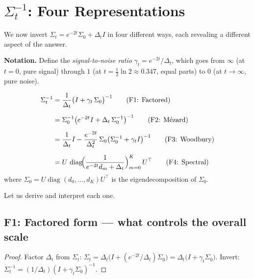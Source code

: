 \documentclass[11pt,a4paper]{article}
\theoremstyle{definition}
\newcommand{\diag}{\operatorname{diag}}
\newcommand{\Dt}{\Delta_t}
\begin{document}
\section{$\Sigma_t^{-1}$: Four Representations}
\label{sec:inversion}

We now invert $\Sigma_t = e^{-2t}\Sigma_0 + \Dt I$ in four different ways, each revealing a different aspect of the answer.

\medskip
\textbf{Notation.}
Define the \emph{signal-to-noise ratio} $\gamma_t = e^{-2t}/\Dt$, which goes from $\infty$ (at $t=0$, pure signal) through $1$ (at $t = \frac{1}{2}\ln 2 \approx 0.347$, equal parts) to $0$ (at $t \to \infty$, pure noise).

\begin{keybox}
\begin{align}
  \Sigma_t^{-1} &= \frac{1}{\Dt}\bigl(I + \gamma_t\,\Sigma_0\bigr)^{-1} \label{eq:factored} \tag{F1: Factored}\\[6pt]
  &= \Sigma_0^{-1}\bigl(e^{-2t}I + \Dt\,\Sigma_0^{-1}\bigr)^{-1} \label{eq:mezard} \tag{F2: M\'ezard}\\[6pt]
  &= \frac{1}{\Dt}I - \frac{e^{-2t}}{\Dt^2}\,\Sigma_0\bigl(\Sigma_0^{-1} + \gamma_t I\bigr)^{-1} \label{eq:woodbury} \tag{F3: Woodbury}\\[6pt]
  &= U\,\diag\!\Bigl(\frac{1}{e^{-2t}d_m + \Dt}\Bigr)_{m=0}^K\,U^\top \label{eq:spectral} \tag{F4: Spectral}
\end{align}
where $\Sigma_0 = U\diag(d_0,\dots,d_K)U^\top$ is the eigendecomposition of $\Sigma_0$.
\end{keybox}

Let us derive and interpret each one.

\subsection{F1: Factored form --- what controls the overall scale}

\begin{proof}
Factor $\Dt$ from $\Sigma_t$:
$\Sigma_t = \Dt\bigl(I + (e^{-2t}/\Dt)\Sigma_0\bigr) = \Dt\bigl(I + \gamma_t\Sigma_0\bigr)$.
Invert: $\Sigma_t^{-1} = (1/\Dt)(I + \gamma_t\Sigma_0)^{-1}$.
\end{proof}
\end{document}
